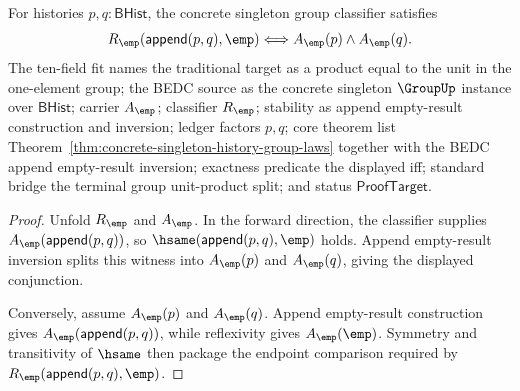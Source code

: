 \begin{theorem}
\label{thm:group-singleton-classifier-product-unit-split}
For histories $p,q:\mathsf{BHist}$, the concrete singleton group classifier
satisfies
$$
R_{\emp}(\mathsf{append}(p,q),\emp)
\Longleftrightarrow
A_{\emp}(p)\land A_{\emp}(q).
$$
The ten-field fit names the traditional target as a product equal to the unit
in the one-element group; the BEDC source as the concrete singleton $\GroupUp$
instance over $\mathsf{BHist}$; carrier $A_{\emp}$; classifier $R_{\emp}$;
stability as append empty-result construction and inversion; ledger factors
$p,q$; core theorem list
Theorem~\ref{thm:concrete-singleton-history-group-laws} together with the BEDC
append empty-result inversion; exactness predicate the displayed iff; standard
bridge the terminal group unit-product split; and status $\mathsf{ProofTarget}$.
\end{theorem}
\begin{proof}
Unfold $R_{\emp}$ and $A_{\emp}$. In the forward direction, the classifier
supplies $A_{\emp}(\mathsf{append}(p,q))$, so
$\hsame(\mathsf{append}(p,q),\emp)$ holds. Append empty-result inversion splits
this witness into $A_{\emp}(p)$ and $A_{\emp}(q)$, giving the displayed
conjunction.

Conversely, assume $A_{\emp}(p)$ and $A_{\emp}(q)$. Append empty-result
construction gives $A_{\emp}(\mathsf{append}(p,q))$, while reflexivity gives
$A_{\emp}(\emp)$. Symmetry and transitivity of $\hsame$ then package the
endpoint comparison required by
$R_{\emp}(\mathsf{append}(p,q),\emp)$.
\end{proof}

